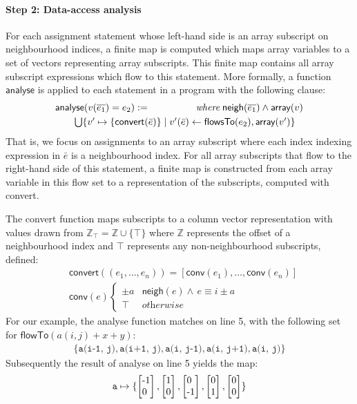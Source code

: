 \documentclass[9pt]{sigplanconf}
\theoremstyle{definition}
\newcommand{\neigh}{\textsf{neigh}}
\newcommand{\arrayTy}{\textsf{array}}
\newcommand{\vtwo}[2]{\setlength{\arraycolsep}{0em}
\left[\begin{array}{l}$#1$\\$#2$\end{array}\right]}
\begin{document}
\paragraph{Step 2: Data-access analysis}

For each assignment statement whose left-hand side is an array
subscript on neighbourhood indices, a finite map is computed which
maps array variables to a set of vectors representing array
subscripts.  This finite map contains all array subscript expressions
which flow to this statement. More formally, a function
$\textsf{analyse}$ is applied to each statement in a program with the
following clause:
%
\begin{align*}
\begin{array}{lr}
\textsf{analyse}(v(\overline{e_1}) = e_2)
 := \qquad\qquad & \textit{where} \; \neigh(\overline{e_1}) \wedge \arrayTy(v)  \\[0.3em]
\multicolumn{2}{l}{\qquad \bigcup\{v' \mapsto \{\textsf{convert}(\bar{e})\} \mid v'(\bar{e}) \leftarrow \mathsf{flowsTo}(e_2),
  \arrayTy(v')\}}
\end{array}
\end{align*}
%
That is, we focus on assignments to an array subscript where each
index indexing expression in $\bar{e}$ is a neighbourhood index.  For
all array subscripts that flow to the right-hand side of this
statement, a finite map is constructed from each array variable
in this flow set to a representation of the subscripts, computed
with \textsf{convert}.

The \textsf{convert} function maps subscripts to a column vector
representation with values drawn from $\mathbb{Z}_\top = \mathbb{Z} \cup \{\top\}$
where $\mathbb{Z}$ represents the offset of a neighbourhood index
and $\top$ represents any non-neighbourhood subscripts, defined:
%
\begin{align*}
& \textsf{convert}((e_1, \ldots, e_n)) = [\textsf{conv}(e_1), \ldots,
  \textsf{conv}(e_n)] \\
& \textsf{conv}(e) \begin{cases}
\pm a & \neigh(e) \wedge \, e \equiv i \pm a \\
\top & \textit{otherwise}
\end{cases}
\end{align*}
%
For our example, the \textsf{analyse} function matches on
line 5, with the following set for $\textsf{flowTo}(a(i, j) + x +
  y)$:
%
\begin{align*}
\{\texttt{a(i-1, j)}, \texttt{a(i+1, j)}, \texttt{a(i, j-1)},
  \texttt{a(i, j+1)}, \texttt{a(i, j)}\}
\end{align*}
Subsequently the result of \textsf{analyse} on line 5 yields the map:
\begin{align*}
\texttt{a} \mapsto \{\vtwo{-1}{0}, \vtwo{1}{0},
          \vtwo{0}{-1}, \vtwo{0}{1}, \vtwo{0}{0}\}
\end{align*}
%
\end{document}
